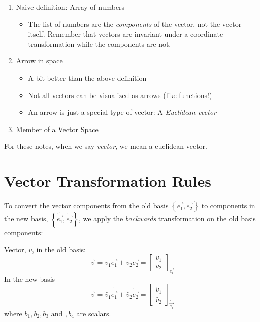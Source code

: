 \documentclass{report}
\begin{document}
{
	\begin{enumerate}
		\item Naive definition: Array of numbers
			\begin{itemize}
				\item The list of numbers are the \emph{components} of the vector, not the vector itself. Remember that vectors are invariant under a coordinate transformation while the components are not.
			\end{itemize}
		\item Arrow in space
			\begin{itemize}
				\item A bit better than the above definition
				\item Not all vectors can be visualized as arrows (like functions!)
				\item An arrow is just a special type of vector: A \emph{Euclidean vector}
			\end{itemize}
		\item Member of a Vector Space
	\end{enumerate}

}

For these notes, when we say \emph{vector}, we mean a euclidean vector.


\chapter{Vector Transformation Rules}
To convert the vector components from the old basis $\left\{ \vec{e_1}, \vec{e_2} \right\} $ to components in the new basis, $\left\{ \tilde{\vec{e_1}}, \tilde{\vec{e_2}} \right\} $, we apply the \emph{backwards} transformation on the old basis components:

Vector, $v$, in the old basis:
$$ \vec{v} = v_1 \vec{e_1} + v_2 \vec{e_2} = \begin{bmatrix} v_1 \\ v_2 \end{bmatrix}_{\vec{e_i}} $$ 
In the new basis
$$ \vec{v} = \tilde{v_1} \tilde{\vec{e_1}} + \tilde{v_2} \tilde{\vec{e_2}} = \begin{bmatrix} \tilde{v_1} \\ \tilde{v_2} \end{bmatrix}_{\tilde{\vec{e_i}}} $$ 
where $b_1, b_2, b_3 \text{ and }, b_4$ are scalars.
\end{document}
